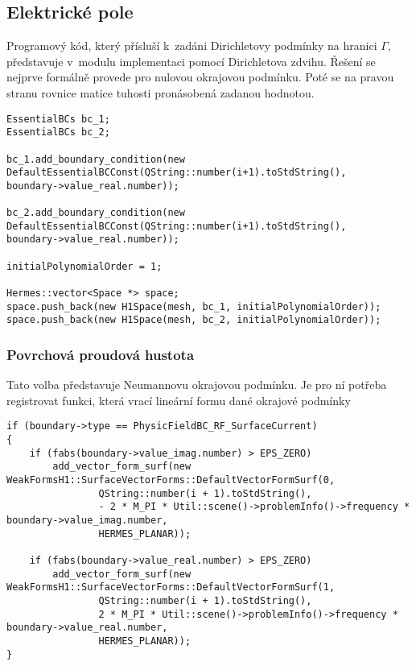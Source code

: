 \subsection*{Elektrické pole}
Programový kód, který přísluší k~zadáni Dirichletovy podmínky na hranici $\Gamma$, představuje v~modulu implementaci pomocí Dirichletova zdvihu.
Řešení se nejprve formálně provede pro nulovou okrajovou podmínku. Poté se na pravou stranu rovnice matice tuhosti pronásobená zadanou
hodnotou. 
\begin{verbatim}
EssentialBCs bc_1;
EssentialBCs bc_2;

bc_1.add_boundary_condition(new
DefaultEssentialBCConst(QString::number(i+1).toStdString(),
boundary->value_real.number));

bc_2.add_boundary_condition(new
DefaultEssentialBCConst(QString::number(i+1).toStdString(),
boundary->value_real.number));

initialPolynomialOrder = 1;

Hermes::vector<Space *> space;
space.push_back(new H1Space(mesh, bc_1, initialPolynomialOrder));
space.push_back(new H1Space(mesh, bc_2, initialPolynomialOrder));
\end{verbatim}

\subsubsection*{Povrchová proudová hustota}
Tato volba představuje Neumannovu okrajovou podmínku. Je pro ní potřeba registrovat funkci, která vrací lineární formu dané okrajové podmínky
\begin{verbatim}
if (boundary->type == PhysicFieldBC_RF_SurfaceCurrent)
{
    if (fabs(boundary->value_imag.number) > EPS_ZERO)
        add_vector_form_surf(new WeakFormsH1::SurfaceVectorForms::DefaultVectorFormSurf(0,
                QString::number(i + 1).toStdString(),
                - 2 * M_PI * Util::scene()->problemInfo()->frequency * boundary->value_imag.number,
                HERMES_PLANAR));
                
    if (fabs(boundary->value_real.number) > EPS_ZERO)
        add_vector_form_surf(new WeakFormsH1::SurfaceVectorForms::DefaultVectorFormSurf(1,
                QString::number(i + 1).toStdString(),
                2 * M_PI * Util::scene()->problemInfo()->frequency * boundary->value_real.number,
                HERMES_PLANAR));
}
\end{verbatim}

